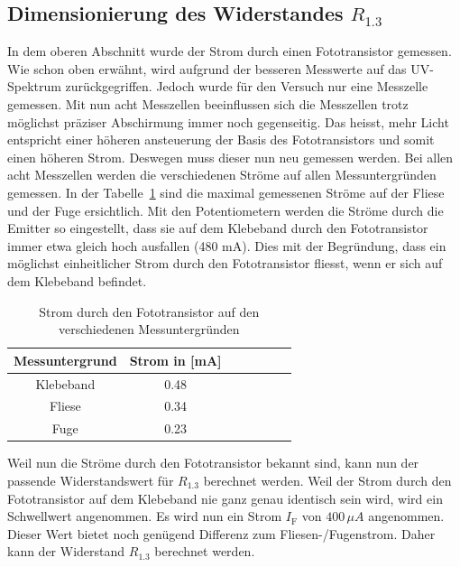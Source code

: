 \documentclass[main.tex]{subfiles} %
\begin{document}
\subsection*{Dimensionierung des Widerstandes $R_{1.3}$}
In dem oberen Abschnitt wurde der Strom durch einen Fototransistor gemessen. Wie schon oben erwähnt, wird aufgrund der besseren Messwerte auf das UV-Spektrum
zurückgegriffen. Jedoch wurde für den Versuch nur eine Messzelle gemessen. Mit nun acht Messzellen beeinflussen sich die Messzellen trotz möglichst präziser 
Abschirmung immer noch gegenseitig. Das heisst, mehr Licht entspricht einer höheren ansteuerung der Basis des Fototransistors und somit einen höheren Strom. 
Deswegen muss dieser nun neu gemessen werden. Bei allen acht Messzellen werden die verschiedenen Ströme auf allen Messuntergründen gemessen. In der Tabelle~\ref{tab:Strommessungen_alle} sind die maximal
gemessenen Ströme auf der Fliese und der Fuge ersichtlich. Mit den Potentiometern werden die Ströme durch die Emitter so eingestellt, dass sie auf dem Klebeband durch den Fototransistor immer 
etwa gleich hoch ausfallen (480 mA). Dies mit der Begründung, dass ein möglichst einheitlicher Strom durch den Fototransistor fliesst, wenn er sich auf dem Klebeband befindet.

\begin{table}[h]                                    
    \centering
    \begin{tabular}{|c|c|c|c|c|c|c|}                        
        \hline
        \textbf{Messuntergrund} & \textbf{Strom in [mA]}        \\ \hline
        Klebeband               & 0.48                          \\ \hline
        Fliese                  & 0.34                          \\ \hline
        Fuge                    & 0.23                          \\ \hline

        \end{tabular}
\caption{Strom durch den Fototransistor auf den verschiedenen Messuntergründen}
\label{tab:Strommessungen_alle}
\end{table}

Weil nun die Ströme durch den Fototransistor bekannt sind, kann nun der passende Widerstandswert für $R_{1.3}$ berechnet werden. Weil der Strom
durch den Fototransistor auf dem Klebeband nie ganz genau identisch sein wird, wird ein Schwellwert angenommen. Es wird nun ein Strom $I_{\text{F}}$ von $400 \, \mu A$
angenommen. Dieser Wert bietet noch genügend Differenz zum Fliesen-/Fugenstrom. Daher kann der Widerstand $R_{1.3}$ berechnet werden.
\end{document}

